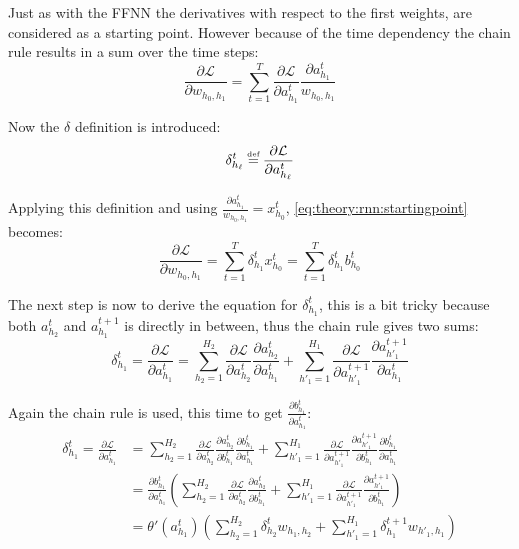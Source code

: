 Just as with the FFNN the derivatives with respect to the first weights, are considered as a starting point. However because of the time dependency the chain rule results in a sum over the time steps:
\begin{equation}
\frac{\partial \mathcal{L}}{\partial w_{h_0, h_1}} = \sum_{t=1}^T \frac{\partial \mathcal{L}}{\partial a_{h_1}^t} \frac{\partial a_{h_1}^t}{w_{h_0, h_1}}
\label{eq:theory:rnn:startingpoint}
\end{equation}

Now the $\delta$ definition is introduced:
\begin{equation}
\delta_{h_\ell}^t \defeq \frac{\partial \mathcal{L}}{\partial a_{h_\ell}^t}
\end{equation}

Applying this definition and using $ \frac{\partial a_{h_1}^t}{w_{h_0, h_1}} = x_{h_0}^t$,  \eqref{eq:theory:rnn:startingpoint} becomes:
\begin{equation}
\frac{\partial \mathcal{L}}{\partial w_{h_0, h_1}} = \sum_{t=1}^T \delta_{h_1}^t x_{h_0}^t = \sum_{t=1}^T \delta_{h_1}^t b_{h_0}^t 
\end{equation}

The next step is now to derive the equation for $\delta_{h_1}^t$, this is a bit tricky because both $a_{h_2}^t$ and $a_{h_1}^{t+1}$ is directly in between, thus the chain rule gives two sums:
\begin{equation}
\delta_{h_1}^t = \frac{\partial \mathcal{L}}{\partial a_{h_1}^t}
= \sum_{h_2 = 1}^{H_2} \frac{\partial \mathcal{L}}{\partial a_{h_2}^t} \frac{\partial a_{h_2}^t}{\partial a_{h_1}^t}
+ \sum_{h'_1 = 1}^{H_1} \frac{\partial \mathcal{L}}{\partial a_{h'_1}^{t+1}} \frac{\partial a_{h'_1}^{t+1}}{\partial a_{h_1}^t}
\end{equation}

Again the chain rule is used, this time to get $\frac{\partial b_{h_1}^t}{\partial a_{h_1}^t}$:
\begin{equation}
\begin{aligned}
\delta_{h_1}^t = \frac{\partial \mathcal{L}}{\partial a_{h_1}^t}
&= \sum_{h_2 = 1}^{H_2} \frac{\partial \mathcal{L}}{\partial a_{h_2}^t} \frac{\partial a_{h_2}^t}{\partial b_{h_1}^t} \frac{\partial b_{h_1}^t}{\partial a_{h_1}^t}
+ \sum_{h'_1 = 1}^{H_1} \frac{\partial \mathcal{L}}{\partial a_{h'_1}^{t+1}} \frac{\partial a_{h'_1}^{t+1}}{\partial b_{h_1}^t} \frac{\partial b_{h_1}^t}{\partial a_{h_1}^t} \\
&= \frac{\partial b_{h_1}^t}{\partial a_{h_1}^t} \left(\sum_{h_2 = 1}^{H_2} \frac{\partial \mathcal{L}}{\partial a_{h_2}^t} \frac{\partial a_{h_2}^t}{\partial b_{h_1}^t}
+ \sum_{h'_1 = 1}^{H_1} \frac{\partial \mathcal{L}}{\partial a_{h'_1}^{t+1}} \frac{\partial a_{h'_1}^{t+1}}{\partial b_{h_1}^t} \right) \\
&= \theta'(a_{h_1}^t) \left( \sum_{h_2=1}^{H_2} \delta_{h_2}^t w_{h_1, h_2}
+ \sum_{h'_1=1}^{H_1} \delta_{h_1}^{t+1} w_{h'_1, h_1} \right)
\end{aligned}
\end{equation}

